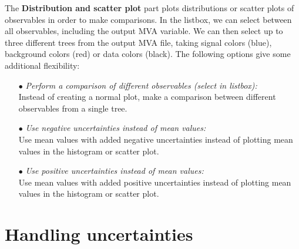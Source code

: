 \documentclass[12pt,a4paper]{report}
\begin{document}
The \textbf{Distribution and scatter plot} part plots distributions or scatter plots of observables in order to make comparisons. In the listbox, we can select between all observables, including the output MVA variable. We can then select up to three different trees from the output MVA file, taking signal colors (blue), background colors (red) or data colors (black). The following options give some additional flexibility:
\begin{itemize}
\item[$\bullet$] \emph{Perform a comparison of different observables (select in listbox):}\\Instead of creating a normal plot, make a comparison between different observables from a single tree.
\item[$\bullet$] \emph{Use negative uncertainties instead of mean values:}\\Use mean values with added negative uncertainties instead of plotting mean values in the histogram or scatter plot.
\item[$\bullet$] \emph{Use positive uncertainties instead of mean values:}\\Use mean values with added positive uncertainties instead of plotting mean values in the histogram or scatter plot.
\end{itemize}

\section{Handling uncertainties} \label{ch:uncert}
\end{document}
